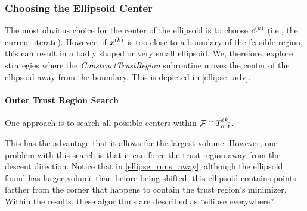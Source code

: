 





\subsubsection{Choosing the Ellipsoid Center}
\label{center_searches}

The most obvious choice for the center of the ellipsoid is to choose $c^{(k)}$ (i.e., the current iterate).  
However, if $x^{(k)}$ is too close to a boundary of the feasible region, this can result in a badly shaped or very small ellipsoid.
We, therefore, explore strategies where the \emph{ConstructTrustRegion} subroutine moves the center of the ellipsoid away from the boundary. 
This is depicted in \cref{ellipse_adv}.



\paragraph{Outer Trust Region Search}

One approach is to search all possible centers within ${\mathcal F} \cap {T_{\text{out}}^{(k)}} $.  

This has the advantage that it allows for the largest volume.
However, one problem with this search is that it can force the trust region away from the descent direction.
Notice that in \cref{ellipse_runs_away}, although the ellipsoid found has larger volume than before being shifted, 
this ellipsoid contains points farther from the corner that happens to contain the trust region's minimizer.
Within the results, these algorithms are described as ``ellipse everywhere''.

